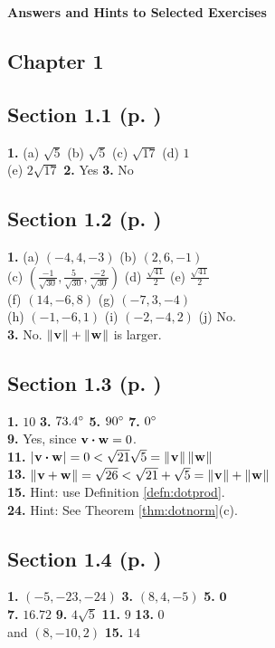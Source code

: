 \textsf{\textbf{\Large Answers and Hints to Selected Exercises}}
\begin{multicols}{2}
\section*{Chapter 1}
\subsection*{Section 1.1 (p. \pageref{sec1dot1})}
\textbf{1.} (a) $\sqrt{5}$ \quad (b) $\sqrt{5}$ \quad (c) $\sqrt{17}$ \quad (d) $1$\\(e) $2 \sqrt{17}$ \quad \textbf{2.}
Yes \quad \textbf{3.} No
\subsection*{Section 1.2 (p. \pageref{sec1dot2})}
\textbf{1.} (a) $(-4,4,-3)$ \quad (b) $(2,6,-1)$\\(c) $\left ( \frac{-1}{\sqrt{30}},\frac{5}{\sqrt{30}},
\frac{-2}{\sqrt{30}}\right )$ \quad (d) $\frac{\sqrt{41}}{2}$ \quad (e) $\frac{\sqrt{41}}{2}$\\(f) $(14,-6,8)$ \quad
(g) $(-7,3,-4)$\\(h) $(-1,-6,1)$ \quad (i) $(-2,-4,2)$ \quad (j) No.\\\textbf{3.} No. $\lVert\mspace{1mu}\textbf{v}\mspace{1mu}\rVert +
\lVert\mspace{1mu}\textbf{w}\mspace{1mu}\rVert$ is larger.
\subsection*{Section 1.3 (p. \pageref{sec1dot3})}
\textbf{1.} $10$ \quad \textbf{3.} $73.4^\circ$ \quad \textbf{5.} $90^\circ$ \quad \textbf{7.} $0^\circ$\\
\textbf{9.} Yes, since $\textbf{v} \bm{\cdot} \textbf{w} = 0$.\\\textbf{11.} $\lvert\mspace{1mu}\textbf{v} \bm{\cdot} \textbf{w}\mspace{1mu}\rvert =
0 < \sqrt{21}\sqrt{5} = \lVert\mspace{1mu}\textbf{v}\mspace{1mu}\rVert\,\lVert\mspace{1mu}\textbf{w}\mspace{1mu}\rVert$\\\textbf{13.} $\lVert\mspace{1mu}\textbf{v} + \textbf{w}\mspace{1mu}\rVert = \sqrt{26}
< \sqrt{21} + \sqrt{5} = \lVert\mspace{1mu}\textbf{v}\mspace{1mu}\rVert + \lVert\mspace{1mu}\textbf{w}\mspace{1mu}\rVert$\\\textbf{15.} Hint: use Definition
\ref{defn:dotprod}.\\
\textbf{24.} Hint: See Theorem \ref{thm:dotnorm}(c).
\subsection*{Section 1.4 (p. \pageref{sec1dot4})}
\textbf{1.} $(-5,-23,-24)$ \quad \textbf{3.} $(8,4,-5)$ \quad \textbf{5.} $\textbf{0}$\\\textbf{7.} $16.72$ \quad
\textbf{9.} $4\sqrt{5}$ \quad \textbf{11.} $9$ \quad \textbf{13.} $0$\\and $(8,-10,2)$ \quad \textbf{15.} $14$

\end{multicols}
